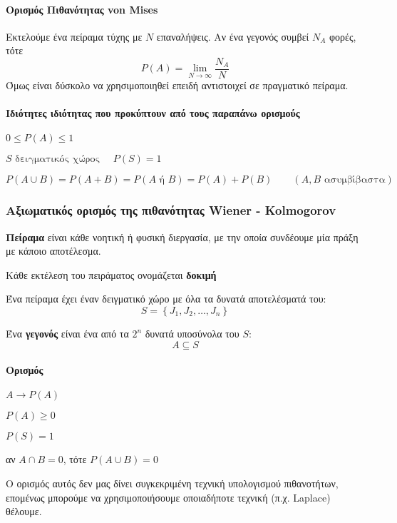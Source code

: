 \documentclass[11pt,a4paper,notitlepage,fleqn,final]{article}
\begin{document}
	\paragraph{Ορισμός Πιθανότητας von Mises}
	Εκτελούμε ένα πείραμα τύχης με \(N\) επαναλήψεις. Αν ένα
	γεγονός συμβεί \(N_A\) φορές, τότε
	\[
	P(A) = \lim_{N\to  \infty } \frac{N_A}{N}
	\]
	Όμως είναι δύσκολο να χρησιμοποιηθεί επειδή αντιστοιχεί σε
	πραγματικό πείραμα.
	\paragraph{Ιδιότητες ιδιότητας που προκύπτουν από
		τους παραπάνω ορισμούς}
	\begin{enumroman}
		\item \( 0 \leq P(A) \leq 1 \)
		\item \( S \text{ δειγματικός χώρος } \quad 
		P(S) = 1 \)
		\item \( P(A\cup B) = P(A+B) = P(A \text{ ή } B)
		= P(A) + P(B) \qquad (A,B \text{ ασυμβίβαστα})
		 \)
	\end{enumroman}
	
	\subsubsection{Αξιωματικός ορισμός της πιθανότητας
		Wiener - Kolmogorov}
	
	\textbf{Πείραμα} είναι κάθε νοητική ή φυσική διεργασία,
	με την οποία
	συνδέουμε μία πράξη με κάποιο αποτέλεσμα.
	
	Κάθε εκτέλεση του πειράματος ονομάζεται \textbf{δοκιμή}
	
	Ένα πείραμα έχει έναν δειγματικό χώρο με όλα τα δυνατά
	αποτελέσματά του:
	\[
	S = \left\lbrace J_1,J_2,\dots,J_n \right\rbrace
	\]
	
	Ένα \textbf{γεγονός} είναι ένα από τα \( 2^n \) δυνατά
	υποσύνολα του \(S\): \[ A \subseteq S \]
	\paragraph{Ορισμός}
	\( A \to P(A) \)	
	\begin{enumroman}
		\item \( P(A) \geq 0 \)
		\item \( P(S) = 1 \)
		\item αν \( A \cap B = 0 \), τότε \( P(A \cup B)
		= 0 \)
	\end{enumroman}
	
	Ο ορισμός αυτός δεν μας δίνει συγκεκριμένη τεχνική υπολογισμού
	πιθανοτήτων, επομένως μπορούμε να χρησιμοποιήσουμε οποιαδήποτε
	τεχνική (π.χ. Laplace) θέλουμε.
	
\end{document}
